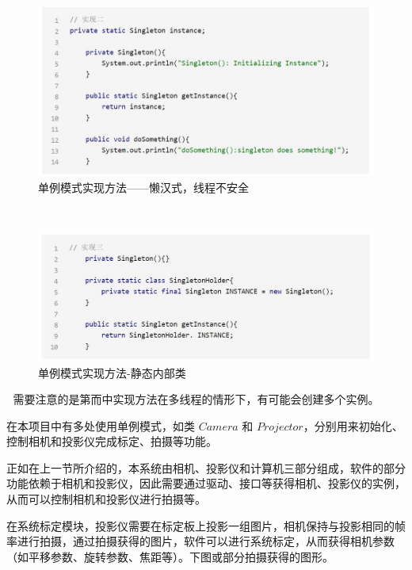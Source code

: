 \documentclass[article]{BJTU-thesis}
\begin{document}
	 	\begin{figure}[!htbp]
	\centering
	\includegraphics[scale=0.5]{7.png}
	\caption{单例模式实现方法——懒汉式，线程不安全}
\end{figure}


	 	\begin{figure}[!htbp]
	\centering
	\includegraphics[scale=0.5]{8.png}
	\caption{单例模式实现方法-静态内部类}
\end{figure}

	需要注意的是第而中实现方法在多线程的情形下，有可能会创建多个实例。
	
	在本项目中有多处使用单例模式，如类 $Camera$ 和 $Projector$，分别用来初始化、控制相机和投影仪完成标定、拍摄等功能。
	
	正如在上一节所介绍的，本系统由相机、投影仪和计算机三部分组成，软件的部分功能依赖于相机和投影仪，因此需要通过驱动、接口等获得相机、投影仪的实例，从而可以控制相机和投影仪进行拍摄等。
	
	在系统标定模块，投影仪需要在标定板上投影一组图片，相机保持与投影相同的帧率进行拍摄，通过拍摄获得的图片，软件可以进行系统标定，从而获得相机参数（如平移参数、旋转参数、焦距等）。下图或部分拍摄获得的图形。
	
\end{document}
